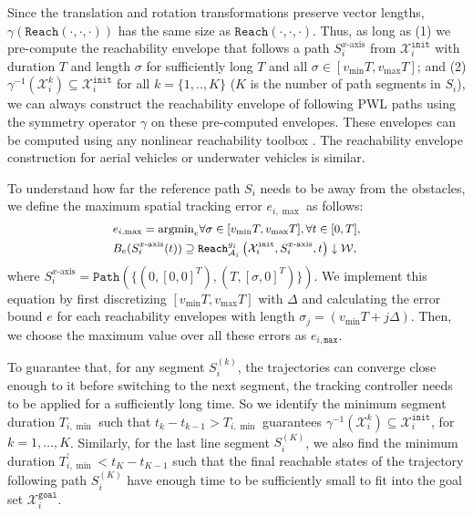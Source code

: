 \documentclass[letterpaper]{article} %
\theoremstyle{definition}
\begin{document}
Since the translation and rotation transformations preserve vector lengths, $\gamma \left(\texttt{Reach}(\cdot,\cdot,\cdot)\right)$ has the same size as  $\texttt{Reach}(\cdot,\cdot,\cdot)$.
Thus, as long as (1)  we pre-compute the reachability envelope that follows a path $S^{x\text{-axis}}_i$ from $\mathcal{X}^\texttt{init}_i$ with duration $T$ and length $\sigma$ for sufficiently long $T$ and all $\sigma \in [v_{\min}T, v_{\max}T ]$; and (2) $\gamma^{-1}(\mathcal{X}^k_i) \subseteq \mathcal{X}^\texttt{init}_i$ for all $k=\{1,..,K\}$ ($K$ is the number of path segments in $S_i$), we can always construct the reachability envelope of following PWL paths using the symmetry operator $\gamma$ on these pre-computed envelopes. These envelopes can be computed using any nonlinear reachability toolbox \cite{chen2013flow,Althoff2018b,fan2017d}. The reachability envelope construction for aerial vehicles or underwater vehicles is similar. 

To understand how far the reference path $S_i$ needs to be away from the obstacles, we define the maximum spatial tracking error $e_{i, \max}$ as follows:
\begin{equation*}\small
\begin{aligned}
&e_{i,\max} = \text{argmin}_{e}  \forall \sigma \in [v_{\min}T, v_{\max}T ], \forall t \in [0,T], \\ &B_{e}(S^{x\text{-axis}}_i(t)) \supseteq 
\texttt{Reach}_{\mathcal{A}_i}^{g_i} \left(\mathcal{X}^\texttt{init}_i, S^{x\text{-axis}}_i,  t\right) \downarrow \mathcal{W},
\end{aligned}
\end{equation*}
where $S^{x\text{-axis}}_i = \texttt{Path}(\{(0,[0,0]^T), (T, [\sigma, 0]^T) \})$.
We implement this equation by first discretizing $[v_{\min}T, v_{\max}T]$ with $\Delta$ and calculating the error bound $e$ for each reachability envelopes with length $\sigma_j = (v_{\min}T+j\Delta)$. Then, we choose the maximum value over all these errors as $e_{i,\texttt{max}}$.

To guarantee that, for any segment $S_i^{(k)}$, the trajectories can converge close enough to it before switching to the next segment, the tracking controller needs to be applied for a sufficiently long time. So we identify the minimum segment duration $T_{i,\min} $ such that $t_k - t_{k-1} > T_{i,\min}$ guarantees $\gamma^{-1}(\mathcal{X}^k_i) \subseteq \mathcal{X}^\texttt{init}_i$, for $k=1, \dots, K$.  Similarly, for the last line segment $S_i^{(K)}$, %
we also find the minimum duration $T_{i,\min}^\prime < t_{K} - t_{K-1} $ such that the final reachable states of the trajectory following path $ S_i^{(K)}$ have enough time to be sufficiently small to fit into the goal set $\mathcal{X}^\texttt{goal}_i$. 
\end{document}
